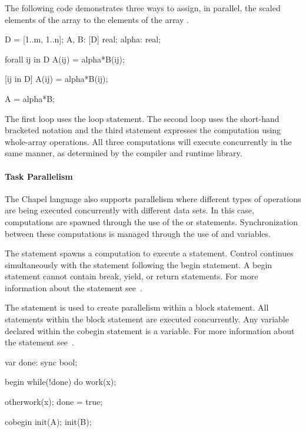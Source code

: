 \begin{example}
The following code demonstrates three ways to assign, in parallel, 
the scaled elements of the array  to the elements of 
the array .  
\begin{chapel}  
D = [1..m, 1..n];
A, B: [D] real;
alpha: real;

forall ij in D {
  A(ij) = alpha*B(ij);
} 

[ij in D] A(ij) = alpha*B(ij);

A = alpha*B;
\end{chapel}
The first loop uses the  loop statement.  
The second loop uses the short-hand bracketed notation and the 
third statement expresses the computation using whole-array operations.  
All three computations will execute concurrently in the same manner,
as determined by the compiler and runtime library.
\end{example}


\paragraph{Task Parallelism}
The Chapel language also supports parallelism where different types of
operations are being executed concurrently with different data sets.
In this case, computations are spawned through the use of the 
or  statements.  Synchronization between these computations
is managed through the use of  and
 variables.

The  statement spawns a computation to execute a
statement. Control continues simultaneously with the statement following
the begin statement.  A begin statement cannot contain break,
yield, or return statements.  For more information about the 
statement see~. 

The  statement is used to create parallelism within
a block statement.  All statements within the block statement
are executed concurrently.  Any variable declared within the cobegin
statement is a  variable.  For more information about
the  statement see~.

\begin{example}
\begin{chapel}
var done: sync bool;
 
begin 
  while(!done) do work(x);

otherwork(x);
done = true;

cobegin {
  init(A);
  init(B);
}
\end{chapel}
\end{example}

